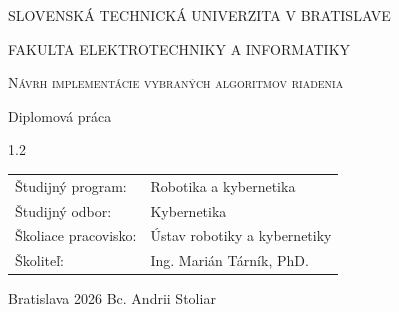 \documentclass[a4paper, 10pt]{article}
\begin{document}

\thispagestyle{empty}

{%
\Large%
\centerline{\MakeUppercase{Slovenská \hfill technická \hfill univerzita \hfill v \hfill Bratislave}}
\centerline{\MakeUppercase{Fakulta elektrotechniky a informatiky}}
}


\vspace{15mm}

\noindent
{}

\vspace{40mm}


\begin{center}
\scshape%
\fontsize{22pt}{24pt}\selectfont
{%
Návrh implementácie vybraných algoritmov riadenia%
}%
\end{center}

\bigskip

\centerline{\Large{Diplomová práca}}

\vfill

\begin{spacing}{1.2}

\fontsize{11pt}{14pt}\selectfont

\noindent
\begin{tabular}{@{}p{4.0cm} l}
Študijný program: & Robotika a kybernetika\\
Študijný odbor: & Kybernetika \\
Školiace pracovisko: & Ústav robotiky a kybernetiky\\
Školiteľ: & Ing. Marián Tárník, PhD.\\
\end{tabular}
\end{spacing}



\vspace{15mm}

\noindent
{%
\large%
Bratislava 2026 \hfill Bc. Andrii Stoliar%
}




\pagebreak
















\end{document}
